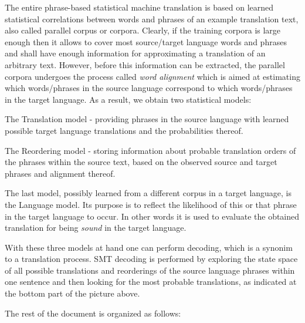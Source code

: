 The entire phrase-\/based statistical machine translation is based on learned statistical correlations between words and phrases of an example translation text, also called parallel corpus or corpora. Clearly, if the training corpora is large enough then it allows to cover most source/target language words and phrases and shall have enough information for approximating a translation of an arbitrary text. However, before this information can be extracted, the parallel corpora undergoes the process called {\itshape word alignment} which is aimed at estimating which words/phrases in the source language correspond to which words/phrases in the target language. As a result, we obtain two statistical models\+:


\begin{DoxyEnumerate}
\item The Translation model -\/ providing phrases in the source language with learned possible target language translations and the probabilities thereof.
\item The Reordering model -\/ storing information about probable translation orders of the phrases within the source text, based on the observed source and target phrases and alignment thereof.
\end{DoxyEnumerate}

The last model, possibly learned from a different corpus in a target language, is the Language model. Its purpose is to reflect the likelihood of this or that phrase in the target language to occur. In other words it is used to evaluate the obtained translation for being {\itshape sound} in the target language.

With these three models at hand one can perform decoding, which is a synonim to a translation process. S\+M\+T decoding is performed by exploring the state space of all possible translations and reorderings of the source language phrases within one sentence and then looking for the most probable translations, as indicated at the bottom part of the picture above.

The rest of the document is organized as follows\+:


